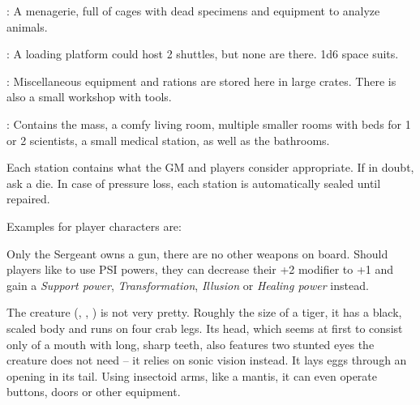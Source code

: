 {		: A menagerie, full of cages with dead specimens and equipment to analyze animals.

		: A loading platform could host 2 shuttles, but none are there. 1d6 space suits.

		: Miscellaneous equipment and rations are stored here in large crates. There is also a small workshop with tools.

		: Contains the mass, a comfy living room, multiple smaller rooms with beds for 1 or 2 scientists, a small medical station, as well as the bathrooms.

		Each station contains what the GM and players consider appropriate. If in doubt, ask a die. In case of pressure loss, each station is automatically sealed until repaired.


		\noindent
		Examples for player characters are:


		\noindent
		Only the Sergeant owns a gun, there are no other weapons on board. Should players like to use PSI powers, they can decrease their +2 modifier to +1 and gain a \emph{Support power}, \emph{Transformation}, \emph{Illusion} or \emph{Healing power} instead.


		\noindent
		The creature (, , ) is not very pretty. Roughly the size of a tiger, it has a black, scaled body and runs on four crab legs. Its head, which seems at first to consist only of a mouth with long, sharp teeth, also features two stunted eyes the creature does not need -- it relies on sonic vision instead. It lays eggs through an opening in its tail. Using insectoid arms, like a mantis, it can even operate buttons, doors or other equipment.

}
